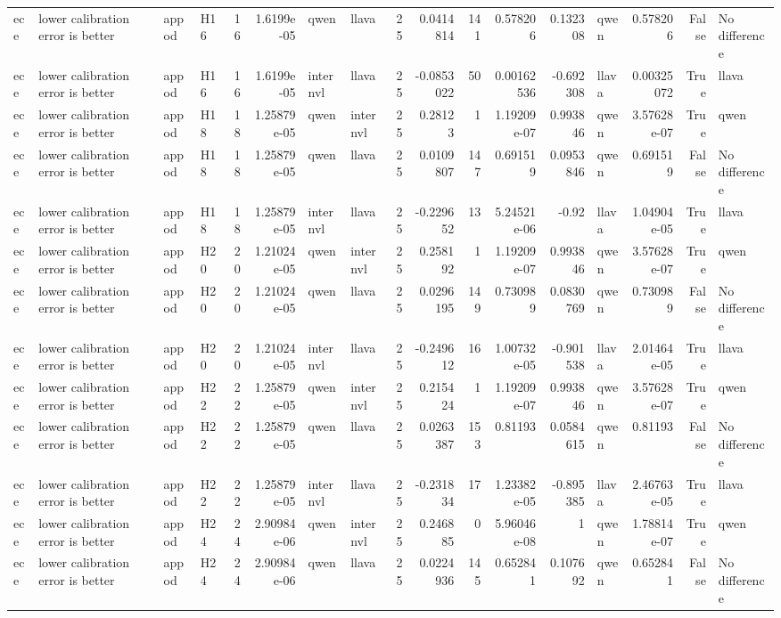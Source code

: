 \begin{longtable}{llllrrllrrrrrlrrl}
ece & lower calibration error is better & appod & H16 & 16 & 1.6199e-05 & qwen & llava & 25 & 0.0414814 & 141 & 0.578206 & 0.132308 & qwen & 0.578206 & False & No difference \\
ece & lower calibration error is better & appod & H16 & 16 & 1.6199e-05 & internvl & llava & 25 & -0.0853022 & 50 & 0.00162536 & -0.692308 & llava & 0.00325072 & True & llava \\
ece & lower calibration error is better & appod & H18 & 18 & 1.25879e-05 & qwen & internvl & 25 & 0.28123 & 1 & 1.19209e-07 & 0.993846 & qwen & 3.57628e-07 & True & qwen \\
ece & lower calibration error is better & appod & H18 & 18 & 1.25879e-05 & qwen & llava & 25 & 0.0109807 & 147 & 0.691519 & 0.0953846 & qwen & 0.691519 & False & No difference \\
ece & lower calibration error is better & appod & H18 & 18 & 1.25879e-05 & internvl & llava & 25 & -0.229652 & 13 & 5.24521e-06 & -0.92 & llava & 1.04904e-05 & True & llava \\
ece & lower calibration error is better & appod & H20 & 20 & 1.21024e-05 & qwen & internvl & 25 & 0.258192 & 1 & 1.19209e-07 & 0.993846 & qwen & 3.57628e-07 & True & qwen \\
ece & lower calibration error is better & appod & H20 & 20 & 1.21024e-05 & qwen & llava & 25 & 0.0296195 & 149 & 0.730989 & 0.0830769 & qwen & 0.730989 & False & No difference \\
ece & lower calibration error is better & appod & H20 & 20 & 1.21024e-05 & internvl & llava & 25 & -0.249612 & 16 & 1.00732e-05 & -0.901538 & llava & 2.01464e-05 & True & llava \\
ece & lower calibration error is better & appod & H22 & 22 & 1.25879e-05 & qwen & internvl & 25 & 0.215424 & 1 & 1.19209e-07 & 0.993846 & qwen & 3.57628e-07 & True & qwen \\
ece & lower calibration error is better & appod & H22 & 22 & 1.25879e-05 & qwen & llava & 25 & 0.0263387 & 153 & 0.81193 & 0.0584615 & qwen & 0.81193 & False & No difference \\
ece & lower calibration error is better & appod & H22 & 22 & 1.25879e-05 & internvl & llava & 25 & -0.231834 & 17 & 1.23382e-05 & -0.895385 & llava & 2.46763e-05 & True & llava \\
ece & lower calibration error is better & appod & H24 & 24 & 2.90984e-06 & qwen & internvl & 25 & 0.246885 & 0 & 5.96046e-08 & 1 & qwen & 1.78814e-07 & True & qwen \\
ece & lower calibration error is better & appod & H24 & 24 & 2.90984e-06 & qwen & llava & 25 & 0.0224936 & 145 & 0.652841 & 0.107692 & qwen & 0.652841 & False & No difference \\

\end{longtable}
